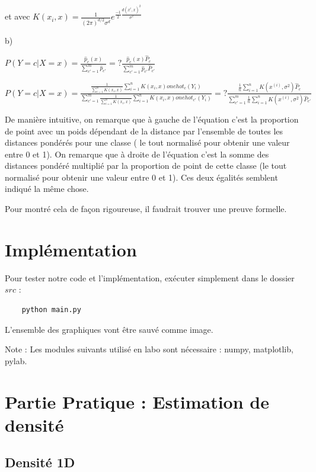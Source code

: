 \documentclass[a4paper,10pt]{article}
\begin{document}
et avec $ K(x_{i}, x) = \frac{1}{ (2 \pi)^{d/2} \sigma^{d}}  e^{ \frac{-1}{2} \frac{d(x^{i},x)^{2}}{\sigma^{2}}} $ 


b)

$P(Y=c | X=x)  = \frac{ \hat{p}_{c}(x) }{ \sum_{c'=1}^{m} \hat{p}_{c'} } =?  \frac{ \hat{p}_{c}(x) \hat{P}_{c}}{ \sum_{c'=1}^{m} \hat{p}_{c'} \hat{P}_{c'} } $

$P(Y=c | X=x)  = \frac{ \frac{1}{ \sum_{i=1}^{n} K(x_{i}, x) } \sum_{i=1}^{n} K(x_{i}, x) onehot_{c}(Y_{i}) }{ \sum_{c'=1}^{m} \frac{1}{ \sum_{i=1}^{n} K(x_{i}, x) } \sum_{i=1}^{n} K(x_{i}, x) onehot_{c'}(Y_{i}) } =?  \frac{  \frac{1}{n} \sum_{i=1}^{n} K(x^{(i)}, \sigma^{2})  \hat{P}_{c}}{ \sum_{c'=1}^{m}  \frac{1}{n} \sum_{i=1}^{n} K(x^{(i)}, \sigma^{2})  \hat{P}_{c'} } $

De manière intuitive, on remarque que à gauche de l'équation c'est la proportion de point avec un poids dépendant de la distance par l'ensemble de toutes les distances pondérés pour une classe ( le tout normalisé pour obtenir une valeur entre 0 et 1). On remarque que à droite de l'équation c'est la somme des distances pondéré multiplié par la proportion de point de cette classe (le tout normalisé pour obtenir une valeur entre 0 et 1). Ces deux égalités semblent indiqué la même chose.

Pour montré cela de façon rigoureuse, il faudrait trouver une preuve formelle.

\section{Implémentation}

Pour tester notre code et l'implémentation, exécuter simplement dans le dossier $src$ :
\begin{verbatim}
	python main.py
\end{verbatim}
L'ensemble des graphiques vont être sauvé comme image.

Note : Les modules suivants utilisé en labo sont nécessaire : numpy, matplotlib, pylab.


\section{Partie Pratique : Estimation de densité}

\subsection{Densité 1D}
\end{document}
